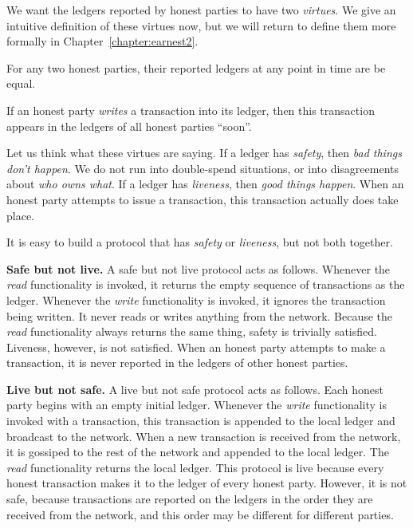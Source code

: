 We want the ledgers reported by honest parties to have two \emph{virtues}. We give
an intuitive definition of these virtues now, but we will return to define them
more formally in Chapter~\ref{chapter:earnest2}.

\begin{definition}
    For any two honest parties, their reported ledgers at any point in time
    are be equal.
\end{definition}

\begin{definition}
    If an honest party \emph{writes} a transaction into its ledger, then this
    transaction appears in the ledgers of all honest parties ``soon''.
\end{definition}

Let us think what these virtues are saying. If a ledger has \emph{safety},
then \emph{bad things don't happen}. We do not run into double-spend situations,
or into disagreements about \emph{who owns what}. If a ledger has \emph{liveness},
then \emph{good things happen}. When an honest party attempts to issue a transaction,
this transaction actually does take place.

It is easy to build a protocol that has \emph{safety} or \emph{liveness}, but not
both together.

\noindent
\textbf{Safe but not live.} A safe but not live protocol acts as follows.
Whenever the \emph{read} functionality is invoked, it returns the empty sequence of
transactions as the ledger. Whenever the \emph{write} functionality is invoked, it
ignores the transaction being written. It never reads or writes anything from the
network. Because the \emph{read} functionality always returns the same thing,
safety is trivially satisfied. Liveness, however, is not satisfied. When an honest
party attempts to make a transaction, it is never reported in the ledgers of other
honest parties.

\noindent
\textbf{Live but not safe.} A live but not safe protocol acts as follows.
Each honest party begins with an empty initial ledger. Whenever the \emph{write}
functionality is invoked with a transaction, this transaction is appended to the
local ledger and broadcast to the network. When a new transaction is received from the
network, it is gossiped to the rest of the network and appended to the local ledger.
The \emph{read} functionality returns the local ledger. This protocol is live
because every honest transaction makes it to the ledger of every honest party.
However, it is not safe, because transactions are reported on the ledgers in the
order they are received from the network, and this order may be different for
different parties.

